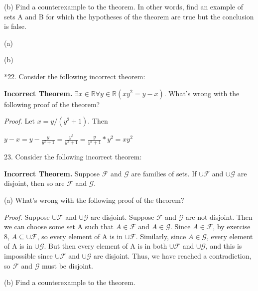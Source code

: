 \documentclass{article}
\begin{document}
\hspace{12pt}(b) Find a counterexample to the theorem. In other words, find an example
of sets A and B for which the hypotheses of the theorem are
true but the conclusion is false.
\vspace{30pt}

(a)

\vspace{20pt}

(b)

\vspace{30pt}

*22. Consider the following incorrect theorem:

\textbf{Incorrect Theorem.} $\exists x \in \mathbb{R} \forall y \in \mathbb{R}(x y^2 = y - x)$.
What's wrong with the following proof of the theorem?

\textit{Proof.} Let $x = y/(y^2 + 1)$. Then

$y - x = y - \frac{y}{y^2 + 1} = \frac{y^3}{y^2 + 1} = \frac{y}{y^2 + 1} * y^2 = x y^2$
\vspace{30pt}



\vspace{30pt}

23. Consider the following incorrect theorem:

\textbf{Incorrect Theorem.} Suppose $\mathcal{F}$ and $\mathcal{G}$ are families of sets. If $\cup \mathcal{F}$ and $\cup \mathcal{G}$ are disjoint, then so are $\mathcal{F}$ and $\mathcal{G}$.

\hspace{12pt}(a) What's wrong with the following proof of the theorem?

\textit{Proof.} Suppose $\cup \mathcal{F}$ and $\cup \mathcal{G}$ are disjoint. Suppose $\mathcal{F}$ and $\mathcal{G}$ are not disjoint. Then we can choose some set A such that $A \in \mathcal{F}$ and $A \in \mathcal{G}$.
Since $A \in \mathcal{F}$, by exercise 8, $A \subseteq \cup\mathcal{F}$, so every element of A is in
$\cup \mathcal{F}$. Similarly, since $A \in \mathcal{G}$, every element of A is in $\cup \mathcal{G}$. But then every element of A is in both $\cup \mathcal{F}$ and $\cup \mathcal{G}$, and this is impossible since
$\cup \mathcal{F}$ and $\cup \mathcal{G}$ are disjoint. Thus, we have reached a contradiction, so
$\mathcal{F}$ and $\mathcal{G}$ must be disjoint.

\hspace{12pt}(b) Find a counterexample to the theorem.
\vspace{30pt}
\end{document}
